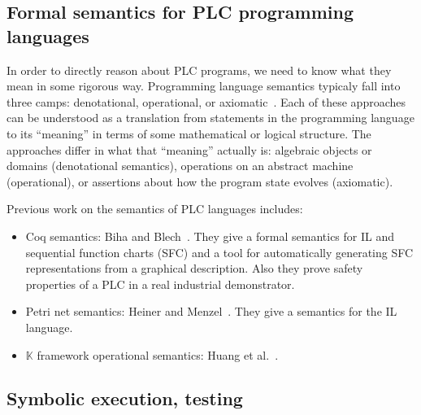 \subsection{Formal semantics for PLC programming languages}

In order to directly reason about PLC programs, we need to know what they mean
in some rigorous way. Programming language semantics typicaly fall into three
camps: denotational, operational, or axiomatic~\cite{hoare:axiomatic}. Each of
these approaches can be understood as a translation from statements in the
programming language to its ``meaning'' in terms of some mathematical or logical
structure. The approaches differ in what that ``meaning'' actually is: algebraic
objects or domains (denotational semantics), operations on an abstract machine
(operational), or assertions about how the program state evolves (axiomatic).

Previous work on the semantics of PLC languages includes:

\begin{itemize}

\item Coq semantics: Biha and Blech~\cite{biha:plc_sem1, biha:plc_sem2,
biha:plc_sem3}. They give a formal semantics for IL and sequential function
charts (SFC) and a tool for automatically generating SFC representations from a
graphical description. Also they prove safety properties of a PLC in a real
industrial demonstrator.


\item Petri net semantics: Heiner and Menzel~\cite{heiner:petri}. They give a
semantics for the IL language.


\item $\mathbb{K}$ framework operational semantics: Huang et al.~\cite{huang:kst}.


\end{itemize}

\subsection{Symbolic execution, testing}

